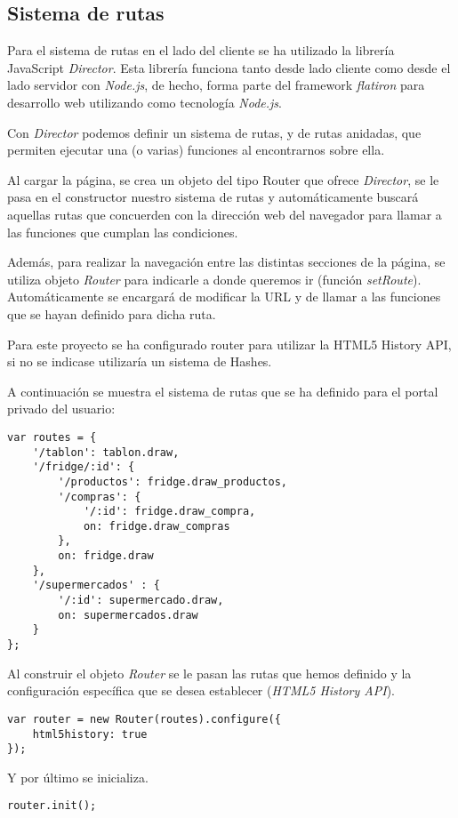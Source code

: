 \subsection{Sistema de rutas}

Para el sistema de rutas en el lado del cliente se ha utilizado la librería JavaScript \emph{Director}. Esta librería funciona tanto desde lado cliente como desde el lado servidor con \emph{Node.js}, de hecho, forma parte del framework \emph{flatiron} para desarrollo web utilizando como tecnología \emph{Node.js}.

Con \emph{Director} podemos definir un sistema de rutas, y de rutas anidadas, que permiten ejecutar una (o varias) funciones al encontrarnos sobre ella.

Al cargar la página, se crea un objeto del tipo Router que ofrece \emph{Director}, se le pasa en el constructor nuestro sistema de rutas y automáticamente buscará aquellas rutas que concuerden con la dirección web del navegador para llamar a las funciones que cumplan las condiciones.

Además, para realizar la navegación entre las distintas secciones de la página, se utiliza objeto \emph{Router} para indicarle a donde queremos ir (función \emph{setRoute}). Automáticamente se encargará de modificar la URL y de llamar a las funciones que se hayan definido para dicha ruta.

Para este proyecto se ha configurado router para utilizar la HTML5 History API, si no se indicase utilizaría un sistema de Hashes.

A continuación se muestra el sistema de rutas que se ha definido para el portal privado del usuario:

    \begin{lstlisting}
var routes = {
    '/tablon': tablon.draw,
    '/fridge/:id': {
        '/productos': fridge.draw_productos,
        '/compras': {
            '/:id': fridge.draw_compra,
            on: fridge.draw_compras
        },
        on: fridge.draw
    },
    '/supermercados' : {
        '/:id': supermercado.draw,
        on: supermercados.draw
    }
};
    \end{lstlisting}

Al construir el objeto \emph{Router} se le pasan las rutas que hemos definido y la configuración específica que se desea establecer (\emph{HTML5 History API}).

    \begin{lstlisting}
var router = new Router(routes).configure({
    html5history: true
});
    \end{lstlisting}

Y por último se inicializa.

    \begin{lstlisting}
router.init();
    \end{lstlisting}


